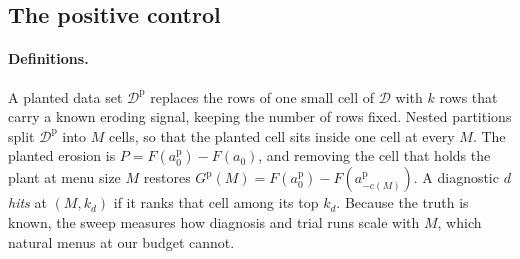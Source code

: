 \documentclass{article}
\theoremstyle{plain}
\theoremstyle{definition}
\theoremstyle{remark}
\begin{document}
\subsection{The positive control}
\label{app:plant}

\paragraph{Definitions.}
A planted data set $\mathcal{D}^{\mathrm{p}}$ replaces the rows of one small
cell of $\mathcal{D}$ with $k$ rows that carry a known eroding signal, keeping the number of rows fixed. Nested partitions split
$\mathcal{D}^{\mathrm{p}}$ into $M$ cells, so that the planted cell sits inside
one cell at every $M$. The planted erosion is
$P = F(a_0^{\mathrm{p}}) - F(a_0)$, and removing the cell that holds the plant
at menu size $M$ restores
$G^{\mathrm{p}}(M) = F(a_0^{\mathrm{p}}) - F(a^{\mathrm{p}}_{-c(M)})$. A
diagnostic $d$ \emph{hits} at $(M, k_d)$ if it ranks that cell among its top
$k_d$. Because the truth is known, the sweep measures how diagnosis and trial
runs scale with $M$, which natural menus at our budget cannot.
\end{document}
